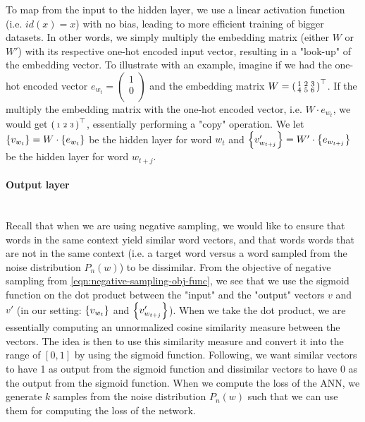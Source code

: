 To map from the input to the hidden layer, we use a linear activation function (i.e. $id(x) = x$) with no bias, leading to more efficient training of bigger datasets. In other words, we simply multiply the embedding matrix (either $W$ or $W'$) with its respective one-hot encoded input vector, resulting in a "look-up" of the embedding vector. To illustrate with an example, imagine if we had the one-hot encoded vector $e_{w_t} = \left( \begin{smallmatrix}
    1\\
    0\\
\end{smallmatrix} \right)$ and the embedding matrix $W = {\left( \begin{smallmatrix}
    1 & 2 & 3\\
    4 & 5 & 6\\
\end{smallmatrix} \right)}^\top$. If the multiply the embedding matrix with the one-hot encoded vector, i.e. $W \cdot e_{w_t}$, we would get ${\left( \begin{smallmatrix}
    1 & 2 & 3\\
\end{smallmatrix} \right)}^\top$, essentially performing a "copy" operation. We let $\left\{v_{w_t}\right\} = W \cdot \left\{e_{w_t}\right\}$ be the hidden layer for word $w_t$ and $\left\{v'_{w_{t+j}}\right\} = W' \cdot \left\{e_{w_{t+j}}\right\}$ be the hidden layer for word $w_{t+j}$. 

\paragraph*{Output layer}\mbox{} \\
Recall that when we are using negative sampling, we would like to ensure that words in the same context yield similar word vectors, and that words words that are not in the same context (i.e. a target word versus a word sampled from the noise distribution $P_n(w)$) to be dissimilar. From the objective of negative sampling from \cref{eqn:negative-sampling-obj-func}, we see that we use the sigmoid function on the dot product between the "input" and the "output" vectors $v$ and $v'$ (in our setting: $\left\{v_{w_t}\right\}$ and $\left\{v'_{w_{t+j}}\right\}$). When we take the dot product, we are essentially computing an unnormalized cosine similarity measure between the vectors. The idea is then to use this similarity measure and convert it into the range of $[0, 1]$ by using the sigmoid function. Following, we want similar vectors to have 1 as output from the sigmoid function and dissimilar vectors to have 0 as the output from the sigmoid function. When we compute the loss of the ANN, we generate $k$ samples from the noise distribution $P_n(w)$ such that we can use them for computing the loss of the network.

